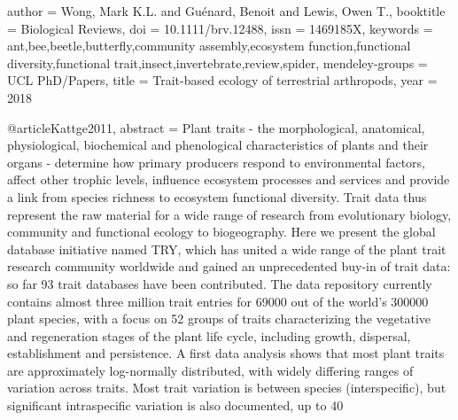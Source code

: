 {{{author = {Wong, Mark K.L. and Gu{\'{e}}nard, Benoit and Lewis, Owen T.},
booktitle = {Biological Reviews},
doi = {10.1111/brv.12488},
issn = {1469185X},
keywords = {ant,bee,beetle,butterfly,community assembly,ecosystem function,functional diversity,functional trait,insect,invertebrate,review,spider},
mendeley-groups = {UCL PhD/Papers},
title = {{Trait-based ecology of terrestrial arthropods}},
year = {2018}
}

@article{Kattge2011,
abstract = {Plant traits - the morphological, anatomical, physiological, biochemical and phenological characteristics of plants and their organs - determine how primary producers respond to environmental factors, affect other trophic levels, influence ecosystem processes and services and provide a link from species richness to ecosystem functional diversity. Trait data thus represent the raw material for a wide range of research from evolutionary biology, community and functional ecology to biogeography. Here we present the global database initiative named TRY, which has united a wide range of the plant trait research community worldwide and gained an unprecedented buy-in of trait data: so far 93 trait databases have been contributed. The data repository currently contains almost three million trait entries for 69000 out of the world's 300000 plant species, with a focus on 52 groups of traits characterizing the vegetative and regeneration stages of the plant life cycle, including growth, dispersal, establishment and persistence. A first data analysis shows that most plant traits are approximately log-normally distributed, with widely differing ranges of variation across traits. Most trait variation is between species (interspecific), but significant intraspecific variation is also documented, up to 40%
}}}}
